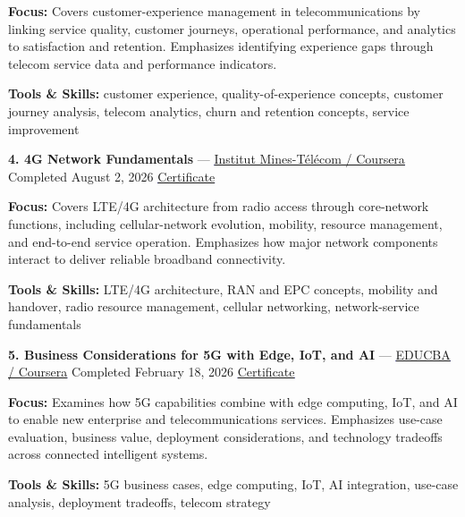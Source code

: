 \documentclass[9pt,letterpaper]{extarticle}
\begin{document}
\textbf{Focus:} Covers customer-experience management in telecommunications by linking service quality, customer journeys, operational performance, and analytics to satisfaction and retention. Emphasizes identifying experience gaps through telecom service data and performance indicators.\par
{\small\textbf{Tools \& Skills:} customer experience, quality-of-experience concepts, customer journey analysis, telecom analytics, churn and retention concepts, service improvement\par}
\vspace{2pt}
\noindent\textbf{4. 4G Network Fundamentals} {\small --- \textcolor{blue}{\underline{\href{https://www.coursera.org/account/accomplishments/verify/DLW1YN474VZJ}{Institut Mines-Télécom / Coursera}}} \textbar{} Completed \textbar{} August 2, 2026 \textbar{} \textcolor{blue}{\underline{\href{https://waseemraza844.github.io/portfolio/certificates/wireless/4g-network-fundamentals.pdf}{Certificate}}}}\par
\textbf{Focus:} Covers LTE/4G architecture from radio access through core-network functions, including cellular-network evolution, mobility, resource management, and end-to-end service operation. Emphasizes how major network components interact to deliver reliable broadband connectivity.\par
{\small\textbf{Tools \& Skills:} LTE/4G architecture, RAN and EPC concepts, mobility and handover, radio resource management, cellular networking, network-service fundamentals\par}
\vspace{2pt}
\noindent\textbf{5. Business Considerations for 5G with Edge, IoT, and AI} {\small --- \textcolor{blue}{\underline{\href{https://www.coursera.org/account/accomplishments/verify/SAUEVQXV5W71}{EDUCBA / Coursera}}} \textbar{} Completed \textbar{} February 18, 2026 \textbar{} \textcolor{blue}{\underline{\href{https://waseemraza844.github.io/portfolio/certificates/wireless/bus-cons-5g.pdf}{Certificate}}}}\par
\textbf{Focus:} Examines how 5G capabilities combine with edge computing, IoT, and AI to enable new enterprise and telecommunications services. Emphasizes use-case evaluation, business value, deployment considerations, and technology tradeoffs across connected intelligent systems.\par
{\small\textbf{Tools \& Skills:} 5G business cases, edge computing, IoT, AI integration, use-case analysis, deployment tradeoffs, telecom strategy\par}
\end{document}
